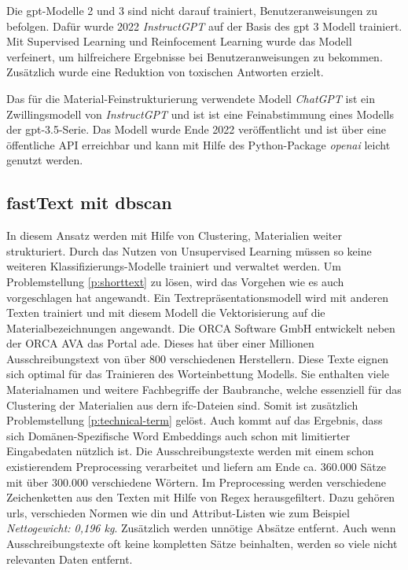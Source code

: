 Die \ac{gpt}-Modelle 2 und 3 sind nicht darauf trainiert, Benutzeranweisungen zu befolgen. Dafür wurde 2022 \textit{InstructGPT} auf der Basis des \ac{gpt} 3 Modell trainiert. Mit Supervised Learning und Reinfocement Learning wurde das Modell verfeinert, um hilfreichere Ergebnisse bei Benutzeranweisungen zu bekommen. Zusätzlich wurde eine Reduktion von toxischen Antworten erzielt. \citep{ouyang2022training}

Das für die Material-Feinstrukturierung verwendete Modell \textit{ChatGPT} ist ein Zwillingsmodell von \textit{InstructGPT} und ist ist eine Feinabstimmung eines Modells der \ac{gpt}-3.5-Serie. \citep{OpenAI2022-la}
Das Modell wurde Ende 2022 veröffentlicht und ist über eine öffentliche API erreichbar und kann mit Hilfe des Python-Package \textit{openai} leicht genutzt werden.

\subsection{fastText mit \acf{dbscan}}
\label{c:conception:fine-structuring:dbscan}
In diesem Ansatz werden mit Hilfe von Clustering, Materialien weiter strukturiert. Durch das Nutzen von Unsupervised Learning müssen so keine weiteren Klassifizierungs-Modelle trainiert und verwaltet werden.
Um Problemstellung \ref{p:shorttext} zu lösen, wird das Vorgehen wie es auch \cite{Qingyuan2019} vorgeschlagen hat angewandt. Ein Textrepräsentationsmodell wird mit anderen Texten trainiert und mit diesem Modell die Vektorisierung auf die Materialbezeichnungen angewandt. 
Die \glqq ORCA Software GmbH\grqq{} entwickelt neben der ORCA AVA das Portal \ac{ade}. Dieses hat über einer Millionen Ausschreibungstext von über 800 verschiedenen Herstellern. Diese Texte eignen sich optimal für das Trainieren des Worteinbettung Modells. Sie enthalten viele Materialnamen und weitere Fachbegriffe der Baubranche, welche essenziell für das Clustering der Materialien aus dern \ac{ifc}-Dateien sind. Somit ist zusätzlich Problemstellung \ref{p:technical-term} gelöst. Auch \cite{nooralahzadeh2018evaluation} kommt auf das Ergebnis, dass sich Domänen-Spezifische Word Embeddings auch schon mit limitierter Eingabedaten nützlich ist. 
Die Ausschreibungstexte werden mit einem schon existierendem Preprocessing verarbeitet und liefern am Ende ca. 360.000 Sätze mit über 300.000 verschiedene Wörtern. Im Preprocessing werden verschiedene Zeichenketten aus den Texten mit Hilfe von Regex herausgefiltert. Dazu gehören \ac{url}s, verschieden Normen wie \ac{din} und Attribut-Listen wie zum Beispiel \textit{Nettogewicht: 0,196 kg}. Zusätzlich werden unnötige Absätze entfernt.
Auch wenn Ausschreibungstexte oft keine kompletten Sätze beinhalten, werden so viele nicht relevanten Daten entfernt.

